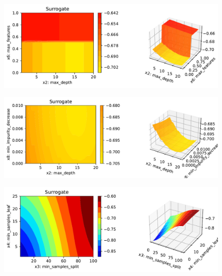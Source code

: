 \documentclass[
  letterpaper,
  DIV=11,
  numbers=noendperiod]{scrreprt}
\begin{document}
\begin{figure}[H]

{\centering \includegraphics{16_spot_hpt_sklearn_multiclass_classification_randomforest_files/figure-pdf/cell-48-output-9.pdf}

}

\end{figure}

\begin{figure}[H]

{\centering \includegraphics{16_spot_hpt_sklearn_multiclass_classification_randomforest_files/figure-pdf/cell-48-output-10.pdf}

}

\end{figure}

\begin{figure}[H]

{\centering \includegraphics{16_spot_hpt_sklearn_multiclass_classification_randomforest_files/figure-pdf/cell-48-output-11.pdf}

}

\end{figure}
\end{document}

